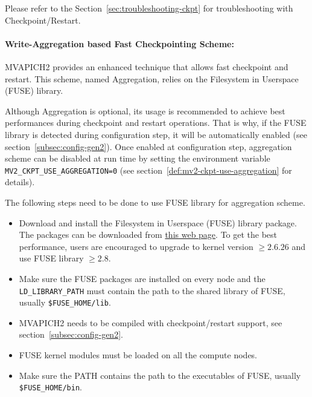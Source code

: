 Please refer to the Section~\ref{sec:troubleshooting-ckpt} for troubleshooting
with Checkpoint/Restart.

\paragraph{Write-Aggregation based Fast Checkpointing Scheme:}
\label{para:mpi-cr-aggr}

MVAPICH2 provides an enhanced technique that allows fast checkpoint and restart.
This scheme, named Aggregation, relies on the Filesystem in Userspace (FUSE)
library.

Although Aggregation is optional, its usage is recommended to achieve best
performances during checkpoint and restart operations. That is why, if the FUSE
library is detected during configuration step, it will be automatically enabled
(see section~\ref{subsec:config-gen2}). Once enabled at configuration step,
aggregation scheme can be disabled at run time by setting the environment
variable \texttt{MV2\_CKPT\_USE\_AGGREGATION=0} (see
section~\ref{def:mv2-ckpt-use-aggregation} for details).


The following steps need to be done to use FUSE library for aggregation scheme.

\begin{itemize}
    \item Download and install the Filesystem in Userspace (FUSE) library
    package. The packages can be downloaded from
    \href{http://fuse.sourceforge.net/}{this web page}.  To get the best
    performance, users are encouraged to upgrade to kernel version $\geq 2.6.26$
    and use FUSE library $\geq 2.8$.

    \item Make sure the FUSE packages are installed on every node and the
    \texttt{LD\_LIBRARY\_PATH} must contain the path to the shared library of
    FUSE, usually \texttt{\${FUSE\_HOME}/lib}.

    \item MVAPICH2 needs to be compiled with checkpoint/restart support, see
    section~\ref{subsec:config-gen2}.

    \item FUSE kernel modules must be loaded on all the compute nodes.

    \item Make sure the PATH contains the path to the executables of FUSE,
    usually \texttt{\${FUSE\_HOME}/bin}.
\end{itemize}

